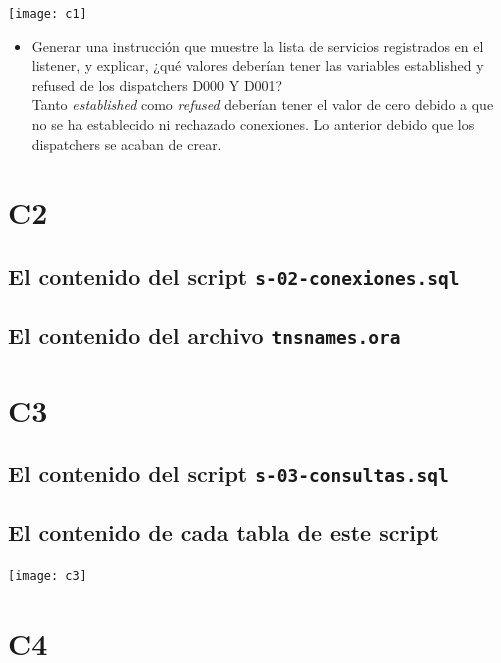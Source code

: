 \documentclass{article}
\begin{document}
\texttt{[image: c1]}

\begin{itemize}
  \item Generar una instrucción que muestre la lista de servicios registrados en
    el listener, y explicar, ¿qué valores deberían tener las variables
    established y refused de los dispatchers D000 Y D001?\\
    Tanto \textit{established} como \textit{refused} deberían tener el valor de
    cero debido a que no se ha establecido ni rechazado conexiones. Lo anterior
    debido que los dispatchers se acaban de crear.
\end{itemize}

\section*{C2}

\subsection*{El contenido del script \texttt{s-02-conexiones.sql}}



\subsection*{El contenido del archivo \texttt{tnsnames.ora}}



\section*{C3}

\subsection*{El contenido del script \texttt{s-03-consultas.sql}}



\subsection*{El contenido de cada tabla de este script}

\texttt{[image: c3]}

\section*{C4}
\end{document}
